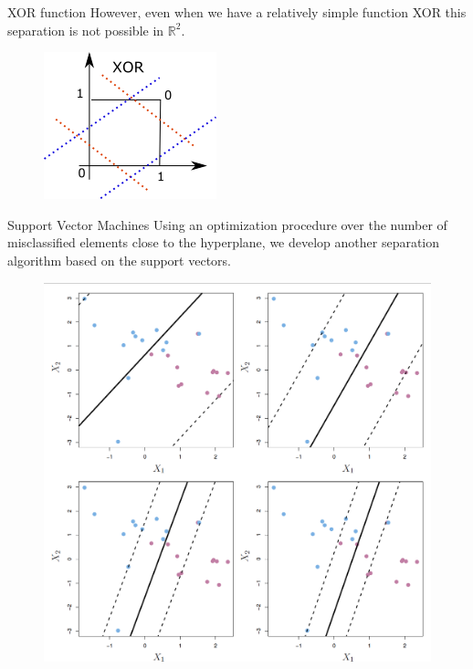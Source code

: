 \documentclass[11pt, aspectratio=43]{beamer}
\begin{document}
\begin{frame}{XOR function}
	However, even when we have a relatively simple function XOR this separation is not possible in $\mathbb{R}^2$.
\begin{figure}[h]
	\centering
	\includegraphics[scale=1.2]{Figures/xor_function.png}
\end{figure}	
	
\end{frame}

\begin{frame}{Support Vector Machines}
	Using an optimization procedure over the number of misclassified elements close to the hyperplane, we develop another separation algorithm based on the support vectors.
\begin{figure}[h]
	\centering
	\includegraphics[scale=0.25]{Figures/fig_changing_c_svm.png}
\end{figure}		
	
\end{frame}
\end{document}
